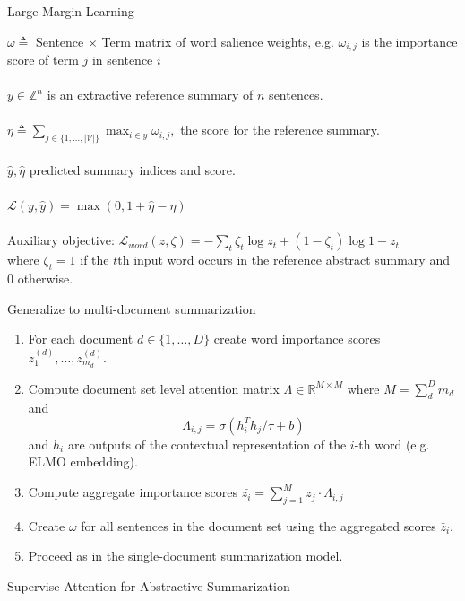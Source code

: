 \begin{frame}{Large Margin Learning}

    $\omega \triangleq $ Sentence $\times$ Term matrix of word salience 
    weights, e.g. $\omega_{i,j}$ is the importance score of term $j$ 
    in sentence $i$ \\

    ~\\
    $y \in \mathbb{Z}^n$ is an extractive reference summary of $n$ sentences.
    ~\\
    ~\\
    $\eta \triangleq \sum_{j \in \{1, \ldots, |\mathcal{V}|\}} 
        \max_{i \in y} \omega_{i,j},$ the score for the reference summary.
    ~\\
    ~\\
    $\hat{y}, \hat{\eta}$ predicted summary indices and score.
    ~\\
    ~\\
    $\mathcal{L}(y, \hat{y}) = \max\left(0, 1 + \hat{\eta} - \eta \right) $ 
    ~\\
    ~\\
    Auxiliary objective: $\mathcal{L}_{word}(z, \zeta) = -\sum_t \zeta_t \log z_t + (1 - \zeta_t) \log 1 - z_t  $ \\
   where $\zeta_t = 1$ if the $t$th input word occurs in the reference abstract
summary and 0 otherwise.

\end{frame}

\begin{frame}{Generalize to multi-document summarization}
\begin{enumerate}
\item For each document $d \in \{1, \ldots, D\}$ create word importance 
scores  $z_1^{(d)}, \ldots, z_{m_d}^{(d)}$.
\item Compute document set level attention matrix 
    $\Lambda \in \mathbb{R}^{M \times M}$ where $M = \sum_d^D m_d$ and 
\[ \Lambda_{i,j} = \sigma(h_i^Th_j / \tau + b)   \] and $h_i$ are outputs
 of the contextual representation of the $i$-th word (e.g. ELMO embedding).
\item Compute aggregate importance scores $\bar{z_i} = \sum_{j=1}^M z_j \cdot \Lambda_{i, j}$ 
\item Create $\omega$ for all sentences in the document set using the aggregated scores  $\bar{z}_i$. 
\item Proceed as in the single-document summarization model.
\end{enumerate}
\end{frame}

\begin{frame}{Supervise Attention for Abstractive Summarization}


\end{frame}
